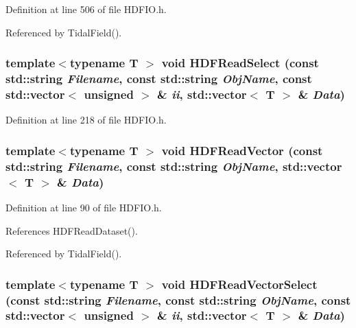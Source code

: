 Definition at line 506 of file HDFIO.h.



Referenced by TidalField().

\subsubsection[{HDFReadSelect}]{\setlength{\rightskip}{0pt plus 5cm}template$<$typename T $>$ void HDFReadSelect (const std::string {\em Filename}, \/  const std::string {\em ObjName}, \/  const std::vector$<$ unsigned $>$ \& {\em ii}, \/  std::vector$<$ T $>$ \& {\em Data})}\label{HDFIO_8h_a7cb9cfc97460cc46d8958d73abf37401}


Definition at line 218 of file HDFIO.h.

\subsubsection[{HDFReadVector}]{\setlength{\rightskip}{0pt plus 5cm}template$<$typename T $>$ void HDFReadVector (const std::string {\em Filename}, \/  const std::string {\em ObjName}, \/  std::vector$<$ T $>$ \& {\em Data})}\label{HDFIO_8h_a7a9e328246922cdfce8ad23cb4040e9b}


Definition at line 90 of file HDFIO.h.



References HDFReadDataset().



Referenced by TidalField().

\subsubsection[{HDFReadVectorSelect}]{\setlength{\rightskip}{0pt plus 5cm}template$<$typename T $>$ void HDFReadVectorSelect (const std::string {\em Filename}, \/  const std::string {\em ObjName}, \/  const std::vector$<$ unsigned $>$ \& {\em ii}, \/  std::vector$<$ T $>$ \& {\em Data})}\label{HDFIO_8h_a5ad5843a221c83e26337a48786e1ef4f}


